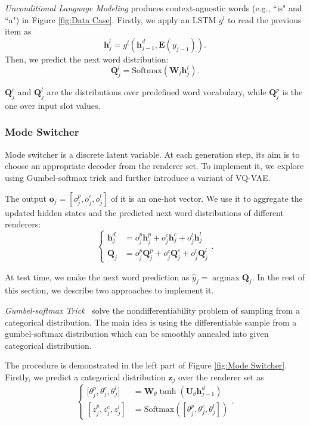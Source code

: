 \documentclass[letterpaper]{article} %
\begin{document}
\textit{Unconditional Language Modeling} produces context-agnostic words (e.g., ``is" and ``a") in Figure \ref{fig:Data Case}. Firstly, we apply an LSTM $g^l$ to read the previous item as
\begin{equation}
\mathbf{h}_j^l = g^l(\mathbf{h}_{j-1}^d, \mathbf{E}(y_{j-1})).
\end{equation}
Then, we predict the next word distribution:
\begin{equation}
\mathbf{Q}^l_j = \mathrm{Softmax}(\mathbf{W}_l \mathbf{h}_j^l).
\end{equation}

$\mathbf{Q}^c_j$ and $\mathbf{Q}^l_j$ are the distributions over predefined word vocabulary, while $\mathbf{Q}^p_j$ is the one over input slot values.

\subsubsection{Mode Switcher}

Mode switcher is a discrete latent variable. At each generation step, its aim is to choose an appropriate decoder from the renderer set. To implement it, we explore using Gumbel-softmax trick and further introduce a variant of VQ-VAE.

The output $\mathbf{o}_j = [o_j^p, o_j^c, o_j^l]$ of it is an one-hot vector. We use it to aggregate the updated hidden states and the predicted next word distributions of different renderers:
\begin{equation}
\label{equ:Equation 11}
\left\{\begin{aligned}
\mathbf{h}^d_j & = o_j^p\mathbf{h}_j^p + o_j^c\mathbf{h}_j^c + o_j^l\mathbf{h}_j^l \\
\mathbf{Q}_j & = o_j^p\mathbf{Q}_j^p + o_j^c\mathbf{Q}_j^c + o_j^l\mathbf{Q}_j^l
\end{aligned}\right..
\end{equation}

At test time, we make the next word prediction as $\hat{y}_j = \mathop{\arg\max} \mathbf{Q}_j$.  In the rest of this section, we describe two approaches to implement it.

\textit{Gumbel-softmax Trick}~\citep{jang2016categorical} solve the nondifferentiability problem of sampling from a categorical distribution. The main idea is using the differentiable sample from a gumbel-softmax distribution which can be smoothly annealed into given categorical distribution.

The procedure is demonstrated in the left part of Figure \ref{fig:Mode Switcher}. Firstly, we predict a categorical distribution $\mathbf{z}_j$ over the renderer set as
\begin{equation}
\label{equ: Equation 12}
\left\{\begin{aligned}
\mathrm{[} \theta_j^p, \theta_j^c, \theta_j^l ] & = \mathbf{W}_\theta\tanh(\mathbf{U}_\theta\mathbf{h}^d_{j-1}) \\
[ z_j^p, z_j^c, z_j^l ] & = \mathrm{Softmax}([ \theta_j^p, \theta_j^c, \theta_j^l ])
\end{aligned}\right..
\end{equation}
\end{document}
